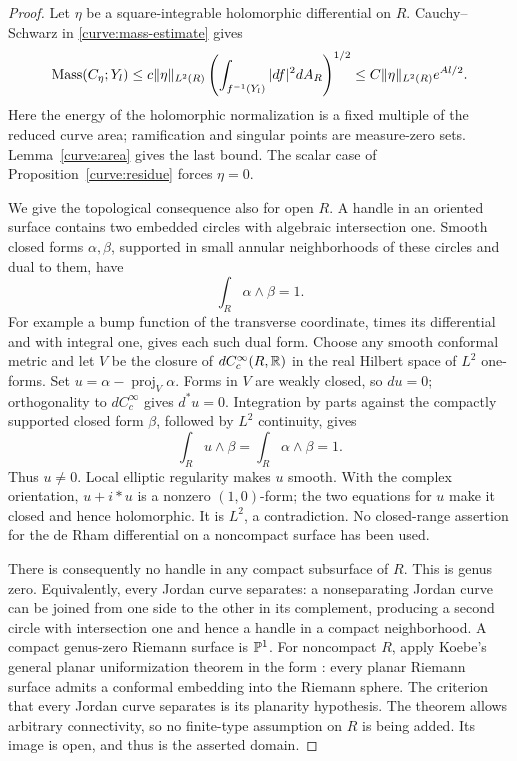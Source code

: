 \begin{proof}
Let $\eta$ be a square-integrable holomorphic differential on $R$.
Cauchy--Schwarz in \eqref{curve:mass-estimate} gives
\[
 \operatorname{Mass}(C_\eta;Y_l)
 \le c\|\eta\|_{L^2(R)}
       \left(\int_{f^{-1}(Y_l)}|df|^2dA_R\right)^{1/2}
 \le C\|\eta\|_{L^2(R)}e^{Al/2}.
\]
Here the energy of the holomorphic normalization is a fixed multiple
of the reduced curve area; ramification and singular points are
measure-zero sets.  Lemma~\ref{curve:area} gives the last bound.
The scalar case of Proposition~\ref{curve:residue} forces $\eta=0$.

We give the topological consequence also for open $R$.  A handle in an
oriented surface contains two embedded circles with algebraic
intersection one.  Smooth closed forms $\alpha,\beta$, supported in
small annular neighborhoods of these circles and dual to them, have
\[
 \int_R\alpha\wedge\beta=1.
\]
For example a bump function of the transverse coordinate, times its
differential and with integral one, gives each such dual form.
Choose any smooth conformal metric and let $V$ be the closure of
$dC_c^\infty(R,\mathbb R)$ in the real Hilbert space of $L^2$ one-forms.
Set $u=\alpha-\operatorname{proj}_V\alpha$.  Forms in $V$ are weakly
closed, so $du=0$; orthogonality to $dC_c^\infty$ gives $d^*u=0$.
Integration by parts against the compactly supported closed form
$\beta$, followed by $L^2$ continuity, gives
\[
 \int_Ru\wedge\beta=\int_R\alpha\wedge\beta=1.
\]
Thus $u\ne0$.  Local elliptic regularity makes $u$ smooth.
With the complex orientation, $u+i*u$ is a nonzero $(1,0)$-form;
the two equations for $u$ make it closed and hence holomorphic.
It is $L^2$, a contradiction.  No closed-range assertion for the
de Rham differential on a noncompact surface has been used.

There is consequently no handle in any compact subsurface of $R$.
This is genus zero.  Equivalently, every Jordan curve separates:
a nonseparating Jordan curve can be joined from one side to the other
in its complement, producing a second circle with intersection one
and hence a handle in a compact neighborhood.  A compact genus-zero
Riemann surface is $\mathbb P^1$.  For noncompact $R$, apply Koebe's general
planar uniformization theorem in the form
\cite[Theorem~1.1]{Hemasundar2011}: every planar Riemann surface admits
a conformal embedding into the Riemann sphere.  The criterion that every
Jordan curve separates is its planarity hypothesis.  The theorem allows
arbitrary connectivity, so no finite-type assumption on $R$
is being added.  Its image is open, and thus is the asserted domain.
\end{proof}
